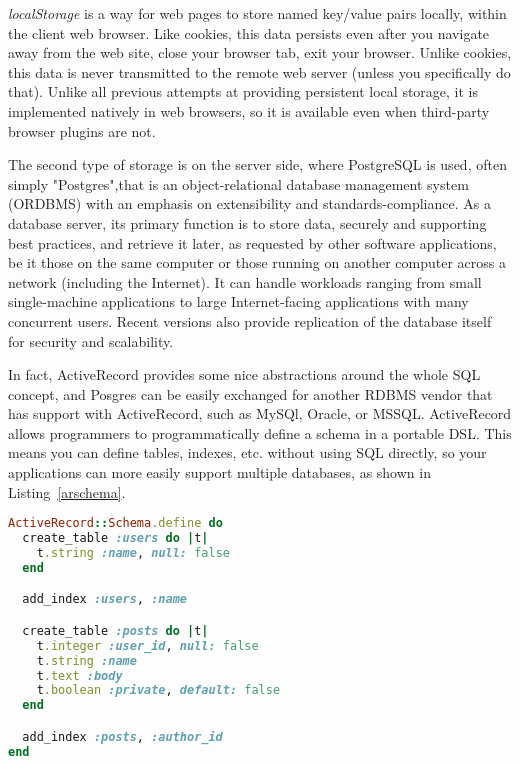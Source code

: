 \textit{localStorage} is a  way for web pages to store named key/value pairs locally, within
the client web browser. Like cookies, this data persists even after you navigate
away from the web site, close your browser tab, exit your browser. Unlike
cookies, this data is never transmitted to the remote web server
(unless you specifically do that). Unlike all previous
attempts at providing persistent local storage, it is implemented natively in
web browsers, so it is available even when third-party browser plugins are not.

The second type of storage is on the server side, where PostgreSQL is used,
often simply "Postgres",that is an object-relational database management
system (ORDBMS) with an emphasis on extensibility and standards-compliance. As a
database server, its primary function is to store data, securely and supporting
best practices, and retrieve it later, as requested by other software
applications, be it those on the same computer or those running on another
computer across a network (including the Internet). It can handle workloads
ranging from small single-machine applications to large Internet-facing
applications with many concurrent users. Recent versions also provide
replication of the database itself for security and scalability.

In fact, ActiveRecord provides some nice abstractions around the whole SQL concept,
and Posgres can be easily exchanged for another RDBMS vendor that has support
with ActiveRecord, such as MySQl, Oracle, or MSSQL.
ActiveRecord allows programmers to programmatically define a schema in a
portable DSL. This means you can define tables, indexes, etc. without using SQL
directly, so your applications can more easily support multiple databases, as shown in Listing~\ref{arschema}.
\begin{lstlisting}[language=Ruby, caption={ActiveRecord Schema definition}, label=arschema]
ActiveRecord::Schema.define do
  create_table :users do |t|
    t.string :name, null: false
  end

  add_index :users, :name

  create_table :posts do |t|
    t.integer :user_id, null: false
    t.string :name
    t.text :body
    t.boolean :private, default: false
  end

  add_index :posts, :author_id
end
\end{lstlisting}


